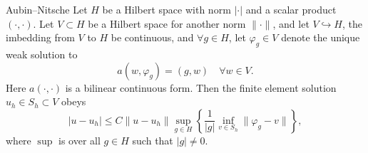 \begin{thmx}{Aubin–Nitsche \label{thm:aubin-nitsche}}
    Let $H$ be a Hilbert space with norm $|\cdot|$ and a scalar product $(\cdot,\cdot)$.
    Let $V\subset H$ be a Hilbert space for another norm $\|\cdot\|$, and let 
    $V \hookrightarrow H$, the imbedding from $V$ to $H$ be continuous,
    and $\forall g \in H$, let $\varphi_g \in V$ denote the unique weak solution to 
    \begin{equation}
        a(w,\varphi_g) = (g,w) \quad \forall w\in V. \label{eq:aubin_nitsche_antagelse}
    \end{equation}
    Here $a(\cdot,\cdot)$ is a bilinear continuous form.
    Then the finite element solution $u_h\in S_h \subset V$ obeys
    \begin{equation*}
        |u-u_h| \leq C \|u-u_h\| \sup_{g\in H} \left \{ \frac{1}{|g|} \inf_{v \in S_h} \|\varphi_g - v\| \right \},
    \end{equation*}
    where $\sup$ is over all $g\in H$ such that $|g|\neq 0$.
\end{thmx}

